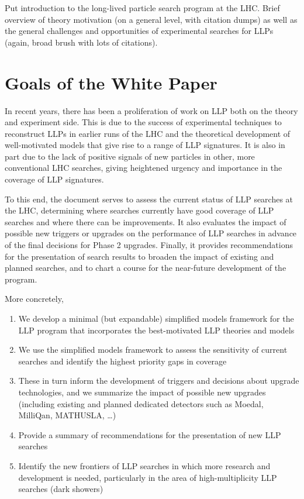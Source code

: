 Put introduction to the long-lived particle search program at the LHC. Brief overview of theory motivation (on a general level, with citation dumps) as well as the general challenges and opportunities of experimental searches for LLPs (again, broad brush with lots of citations).

\section{Goals of the White Paper}

In recent years, there has been a proliferation of work on LLP both on the theory and experiment side. This is due to the success of experimental techniques to reconstruct LLPs in earlier runs of the LHC and the theoretical development of well-motivated models that give rise to a range of LLP signatures. It is also in part due to the lack of positive signals of new particles in other, more conventional LHC searches, giving heightened urgency and importance in the coverage of LLP signatures.

To this end, the document serves to assess the current status of LLP searches at the LHC, determining where searches currently have good coverage of LLP searches and where there can be improvements. It also evaluates the impact of possible new triggers or upgrades on the performance of LLP searches in advance of the final decisions for Phase 2 upgrades. Finally, it provides recommendations for the presentation of search results to broaden the impact of existing and planned searches, and to chart a course for the near-future development of the program.

More concretely,
%
\begin{enumerate}
\item We develop a minimal (but expandable) simplified models framework for the LLP program that incorporates the best-motivated LLP theories and models
\item We use the simplified models framework to assess the sensitivity of current searches and identify the highest priority gaps in coverage
\item These in turn inform the development of triggers and decisions about upgrade technologies, and we summarize the impact of possible new upgrades (including existing and planned dedicated detectors such as Moedal, MilliQan, MATHUSLA, \dots)
\item Provide a summary of recommendations for the presentation of new LLP searches
\item Identify the new frontiers of LLP searches in which more research and development is needed, particularly in the area of high-multiplicity LLP searches (dark showers)
\end{enumerate}